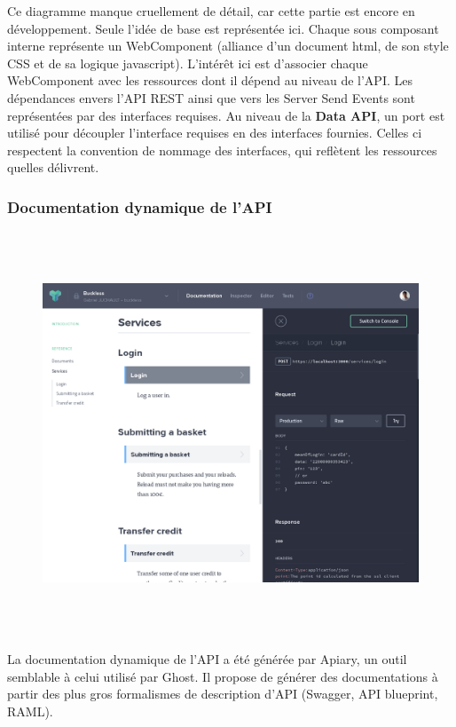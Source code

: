        Ce diagramme manque cruellement de détail, car cette partie est encore en développement.
        Seule l'idée de base est représentée ici. Chaque sous composant interne représente un WebComponent
        (alliance d'un document html, de son style CSS et de sa logique javascript). L'intérêt ici est
        d'associer chaque WebComponent avec les ressources dont il dépend au niveau de l'API.
        Les dépendances envers l'API REST ainsi que vers les Server Send Events sont représentées par
        des interfaces requises. Au niveau de la \textbf{Data API}, un port est utilisé pour découpler
        l'interface requises en des interfaces fournies. Celles ci respectent la convention de nommage
        des interfaces, qui reflètent les ressources quelles délivrent.

    \newpage
    \subsubsection{Documentation dynamique de l'API}
        \begin{figure}[h]
            \centering
            \includegraphics[height=12cm]{./assets/apiary.png}
        \end{figure}
        La documentation dynamique de l'API a été générée par Apiary, un outil semblable à
        celui utilisé par Ghost. Il propose de générer des documentations à partir des plus gros
        formalismes de description d'API (Swagger, API blueprint, RAML).